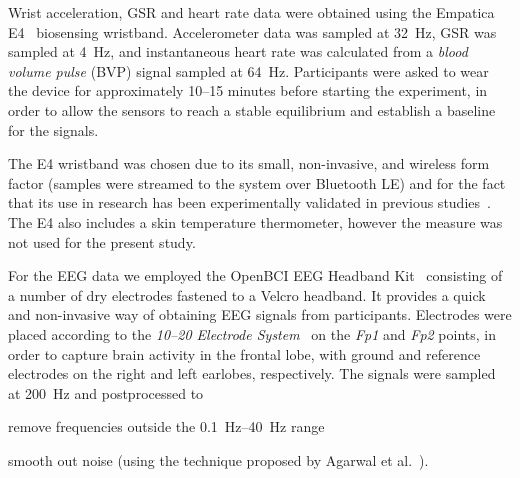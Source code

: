 \documentclass[10pt,letterpaper]{article}
\providecommand{\DIFaddtex}[1]{#1} %
\providecommand{\DIFdeltex}[1]{} %
\providecommand{\DIFaddbegin}{\protect\color{blue}} %
\providecommand{\DIFaddend}{\protect\color{black}} %
\providecommand{\DIFdelbegin}{\protect\color{red}} %
\providecommand{\DIFdelend}{\protect\color{black}} %
\providecommand{\DIFadd}[1]{\texorpdfstring{\DIFaddtex{#1}}{#1}} %
\providecommand{\DIFdel}[1]{\texorpdfstring{\DIFdeltex{#1}}{}} %
\newcommand{\DIFscaledelfig}{0.5}
\newlength{\DIFdelgraphicswidth} %
\newlength{\DIFdelgraphicsheight} %
\newcommand{\DIFaddincludegraphics}[2][]{{\color{blue}\fbox{\DIFOincludegraphics[#1]{#2}}}} %
\newcommand{\DIFdelincludegraphics}[2][]{%
\sbox{\DIFdelgraphicsbox}{\DIFOincludegraphics[#1]{#2}}%
\settoboxwidth{\DIFdelgraphicswidth}{\DIFdelgraphicsbox} %
\settoboxtotalheight{\DIFdelgraphicsheight}{\DIFdelgraphicsbox} %
\scalebox{\DIFscaledelfig}{%
\parbox[b]{\DIFdelgraphicswidth}{\usebox{\DIFdelgraphicsbox}\\[-\baselineskip] \rule{\DIFdelgraphicswidth}{0em}}\llap{\resizebox{\DIFdelgraphicswidth}{\DIFdelgraphicsheight}{%
\setlength{\unitlength}{\DIFdelgraphicswidth}%
\begin{picture}(1,1)%
\thicklines\linethickness{2pt} %
{\color[rgb]{1,0,0}\put(0,0){\framebox(1,1){}}}%
{\color[rgb]{1,0,0}\put(0,0){\line( 1,1){1}}}%
{\color[rgb]{1,0,0}\put(0,1){\line(1,-1){1}}}%
\end{picture}%
}\hspace*{3pt}}} %
} %
\DeclareRobustCommand{\DIFaddbegin}{\DIFOaddbegin \let\includegraphics\DIFaddincludegraphics} %
\DeclareRobustCommand{\DIFaddend}{\DIFOaddend \let\includegraphics\DIFOincludegraphics} %
\DeclareRobustCommand{\DIFdelbegin}{\DIFOdelbegin \let\includegraphics\DIFdelincludegraphics} %
\DeclareRobustCommand{\DIFdelend}{\DIFOaddend \let\includegraphics\DIFOincludegraphics} %
\begin{document}
Wrist acceleration, GSR and heart rate data were obtained using the Empatica E4~\cite{empatica:e4} biosensing wristband.
Accelerometer data was sampled at \SI{32}{\hertz},
GSR was sampled at \SI{4}{\hertz}, and instantaneous heart rate was calculated from a \emph{blood volume pulse} (BVP) signal sampled at \SI{64}{\hertz}.
Participants were asked to wear the device for approximately 10--15 minutes before starting the experiment, in order to allow the sensors to reach \DIFdelbegin \DIFdel{an }\DIFdelend \DIFaddbegin \DIFadd{a }\DIFaddend stable equilibrium and establish a baseline for the signals.

The E4 wristband was chosen due to its small, non-invasive\DIFaddbegin \DIFadd{, }\DIFaddend and wireless form factor (samples were streamed to the system over Bluetooth LE) and for the fact that its use in research has been experimentally validated in previous \DIFdelbegin \DIFdel{research}\DIFdelend \DIFaddbegin \DIFadd{studies}\DIFaddend ~\cite{ragot2017emotion, mccarthy2016validation}.
The E4 also includes a skin temperature thermometer\DIFdelbegin \DIFdel{; however, due to failure to reach equilibrium, }\DIFdelend \DIFaddbegin \DIFadd{, however }\DIFaddend the measure was not used for the present study.

For the EEG data we employed the OpenBCI EEG Headband Kit~\cite{openbci:headbandkit} \DIFdelbegin \DIFdel{, a kit }\DIFdelend consisting of a number of dry electrodes fastened to a Velcro headband.
It \DIFdelbegin \DIFdel{thus }\DIFdelend provides a quick \DIFdelbegin \DIFdel{, easy }\DIFdelend and non-invasive way of obtaining EEG signals from participants.
Electrodes were placed according to the \emph{10--20 Electrode System}~\cite{eeg1020system:1961} on the \emph{Fp1} and \emph{Fp2} points, in order to capture brain activity in the frontal lobe\DIFdelbegin \DIFdel{.
Ground }\DIFdelend \DIFaddbegin \DIFadd{, with ground }\DIFaddend and reference electrodes \DIFdelbegin \DIFdel{were positioned }\DIFdelend on the right and left earlobes\DIFaddbegin \DIFadd{, respectively.
The signals }\DIFaddend were sampled at \SI{200}{\hertz} and \DIFaddbegin \DIFadd{postprocessed to 
}\begin{enumerate*}[itemjoin={{, }},
                  itemjoin*={{, and }},
                  label={{(\arabic*)}}]
  \item remove frequencies outside the \SIrange{0.1}{40}{\hertz} range
  \item smooth out noise (using the technique proposed by Agarwal et al.~\cite{agarwal2017eeg}).
\end{enumerate*}
\DIFaddend 
\end{document}
